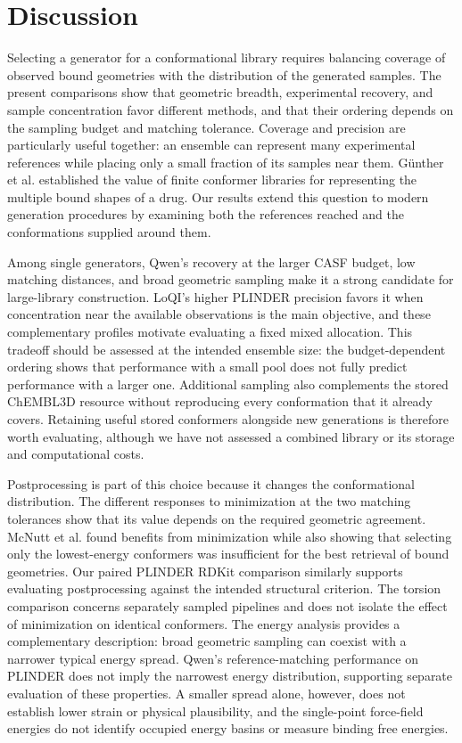 \section{Discussion}
\label{sec:discussion}

Selecting a generator for a conformational library requires balancing coverage of observed
bound geometries with the distribution of the generated samples. The present comparisons
show that geometric breadth, experimental recovery, and sample concentration favor different
methods, and that their ordering depends on the sampling budget and matching tolerance.
Coverage and precision are particularly useful together: an ensemble can represent many
experimental references while placing only a small fraction of its samples near them.
G{\"u}nther et al.\cite{gunther2006representation} established the value of finite conformer
libraries for representing the multiple bound shapes of a drug. Our results extend this
question to modern generation procedures by examining both the references reached and the
conformations supplied around them.

Among single generators, Qwen's recovery at the larger CASF budget, low matching
distances, and broad geometric sampling make it a strong candidate for large-library
construction. LoQI's higher PLINDER precision favors it when concentration near the available
observations is the main objective, and these complementary profiles motivate evaluating
a fixed mixed allocation. This tradeoff should be assessed at the intended ensemble
size: the budget-dependent ordering shows that performance with a small pool does not fully
predict performance with a larger one. Additional sampling also complements the stored
ChEMBL3D resource without reproducing every conformation that it already covers. Retaining
useful stored conformers alongside new generations is therefore worth evaluating, although
we have not assessed a combined library or its storage and computational costs.

Postprocessing is part of this choice because it changes the conformational distribution.
The different responses to minimization at the two matching tolerances show that its value
depends on the required geometric agreement. McNutt et al.\cite{mcnutt2023conformers} found
benefits from minimization while also showing that selecting only the lowest-energy
conformers was insufficient for the best retrieval of bound geometries. Our paired PLINDER RDKit
comparison similarly supports evaluating postprocessing against the intended structural
criterion. The torsion comparison concerns separately sampled pipelines and does not
isolate the effect of minimization on identical conformers.
The energy analysis provides a complementary description: broad geometric sampling can
coexist with a narrower typical energy spread. Qwen's reference-matching performance
on PLINDER does not imply the narrowest energy distribution, supporting separate
evaluation of these properties. A smaller spread alone, however, does not
establish lower strain or physical plausibility, and the single-point force-field energies
do not identify occupied energy basins or measure binding free energies.

